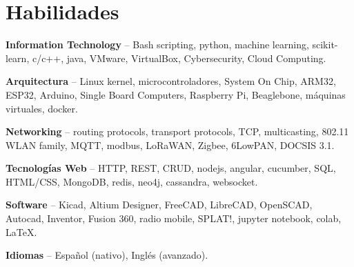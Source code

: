 \section{Habilidades}
\begin{small}
	\parbox[t][][t]{\linewidth}{
		\textbf{Information Technology} -- {Bash scripting, python, machine learning, 
		scikit-learn, c/c++, java, VMware, VirtualBox, Cybersecurity, Cloud Computing.}
		\bigbreak
	}
	\parbox[t][][t]{\linewidth}{
		\textbf{Arquitectura} -- {Linux kernel, 
		microcontroladores, System On Chip, 
		ARM32, ESP32, Arduino, Single Board Computers, Raspberry Pi, Beaglebone, 
		máquinas virtuales, docker.}
		\bigbreak
	}
	\parbox[t][][t]{\linewidth}{
		\textbf{Networking} -- {routing protocols, transport protocols, TCP,
		multicasting, 802.11 WLAN family, MQTT, modbus, LoRaWAN, Zigbee, 6LowPAN, DOCSIS 3.1.}
		\bigbreak
	}
	\parbox[t][][t]{\linewidth}{
		\textbf{Tecnologías Web} -- {HTTP, REST, CRUD, nodejs, angular, cucumber, 
		SQL, HTML/CSS, MongoDB, redis, neo4j, cassandra, websocket.}
		\bigbreak
	}
	\parbox[t][][t]{\linewidth}{
		\textbf{Software} -- {Kicad, Altium Designer, FreeCAD, 
		LibreCAD, OpenSCAD, Autocad, Inventor, Fusion 360, radio mobile, SPLAT!, jupyter notebook, colab,
		 \LaTeX.}
		\bigbreak
	}
	\parbox[t][][t]{\linewidth}{
		\textbf{Idiomas} -- {Español (nativo), Inglés (avanzado).}
		\bigbreak
	}
\end{small}
